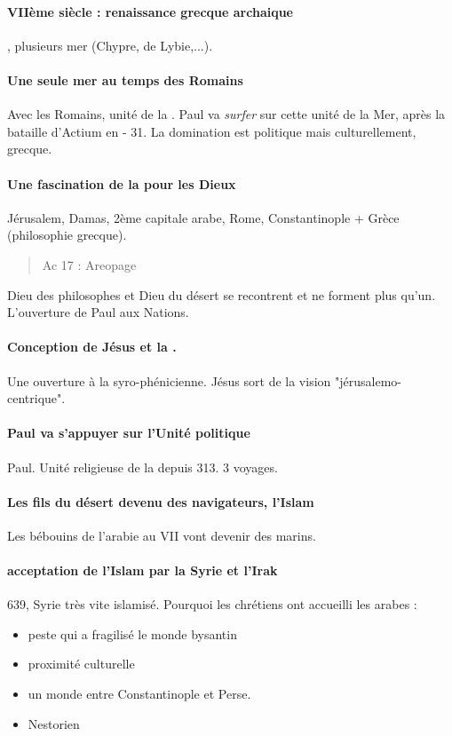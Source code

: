\paragraph{VIIème siècle : renaissance grecque archaique} \Med, plusieurs mer (Chypre, de Lybie,...). 

\paragraph{Une seule mer au temps des Romains} Avec les Romains, unité de la \Med. Paul va \textit{surfer} sur cette unité de la Mer, après la bataille d'Actium en - 31. La domination est politique mais culturellement, grecque. 

\paragraph{Une fascination de la \Med pour les Dieux} Jérusalem, Damas, 2ème capitale arabe, Rome, Constantinople + Grèce (philosophie grecque).  
\begin{quote}
   Ac 17  : Areopage 
\end{quote}
Dieu des philosophes et Dieu du désert se recontrent et ne forment plus qu'un. L'ouverture de Paul aux Nations. 

\paragraph{Conception de Jésus et la \Med.} Une ouverture à la syro-phénicienne. Jésus sort de la vision "jérusalemo-centrique".

\paragraph{Paul va s'appuyer sur l'Unité politique}
Paul. Unité religieuse de la \Med depuis 313. 3 voyages. 

\paragraph{Les fils du désert devenu des navigateurs, l'Islam} Les bébouins de l'arabie au VII vont devenir des marins. 

\paragraph{acceptation de l'Islam par la Syrie et l'Irak} 639, Syrie très vite islamisé. Pourquoi les chrétiens ont accueilli les arabes : 
\begin{itemize}
    \item peste qui a fragilisé le monde bysantin
    \item proximité culturelle
    \item un monde entre Constantinople et Perse.
    \item Nestorien
\end{itemize}

